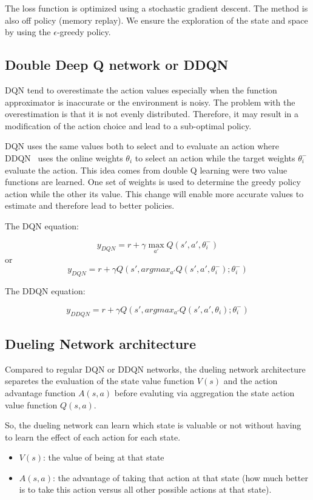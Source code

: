 \documentclass[12pt]{article}
\begin{document}
The loss function is optimized using a stochastic gradient descent.
The method is also off policy (memory replay). We ensure the exploration of the state and space by using the $\epsilon$-greedy policy.


\subsection{Double Deep Q network or DDQN}
DQN tend to overestimate the action values especially when the function approximator is inaccurate or the environment is noisy. The problem with the overestimation is that it is not evenly distributed. Therefore, it may result in a modification of the action choice and lead to a sub-optimal policy.

DQN uses the same values both to select and to evaluate an action where DDQN~\cite{Hasselt2016} uses the online weights $\theta_i$ to select an action while the target weights $\theta_i^-$ evaluate the action. 
This idea comes from double Q learning were two value functions are learned.
One set of weights is used to determine the greedy policy action while the other its value.
This change will enable more accurate values to estimate and therefore lead to better policies.

The DQN equation:

\begin{equation}
	y_{DQN}=r+\gamma \max_{a'} Q(s',a',\theta_i^-)
\end{equation}
or 
\begin{equation}
	y_{DQN}=r+\gamma Q(s',argmax_{a'} Q(s',a',\theta_i^-);\theta_i^-)
\end{equation}

The DDQN equation:

\begin{equation}
	y_{DDQN}=r+\gamma Q(s',argmax_{a'} Q(s',a',\theta_i);\theta_i^-)
\end{equation}

\subsection{Dueling Network architecture}
Compared to regular DQN or DDQN networks, the dueling network architecture~\cite{BellemareDM17} separetes the evaluation of the state value function $V(s)$ and the action advantage function $A(s,a)$ before evaluting via aggregation the state action value function $Q(s,a)$.

So, the dueling network can learn which state is valuable or not without having to learn the effect of each action for each state.
\begin{itemize}
\item $V(s)$: the value of being at that state
\item $A(s,a)$: the advantage of taking that action at that state (how much better is to take this action versus all other possible actions at that state).
\end{itemize}
\end{document}
